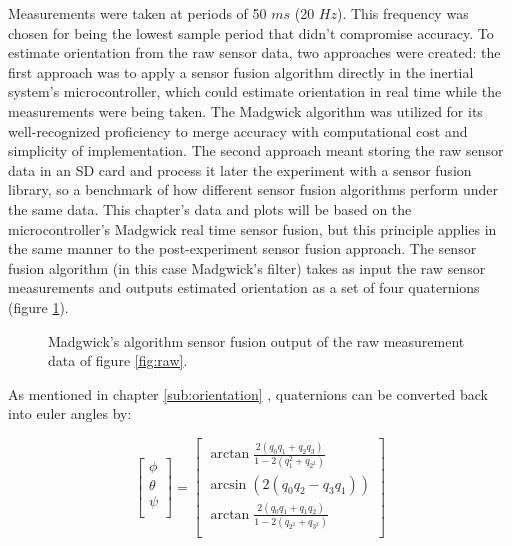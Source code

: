 Measurements were taken at periods of 50 $ms$ (20 $Hz$). This frequency was chosen for being the lowest sample period that didn't compromise accuracy. To estimate orientation from the raw sensor data, two approaches were created: the first approach was to apply a sensor fusion algorithm directly in the inertial system's microcontroller, which could estimate orientation in real time while the measurements were being taken. The Madgwick algorithm was utilized for its well-recognized proficiency to merge accuracy with computational cost and simplicity of implementation. The second approach meant storing the raw sensor data in an SD card and process it later the experiment with a sensor fusion library, so a benchmark of how different sensor fusion algorithms perform under the same data. This chapter's data and plots will be based on the microcontroller's Madgwick real time sensor fusion, but this principle applies in the same manner to the post-experiment sensor fusion approach. The sensor fusion algorithm (in this case Madgwick's filter) takes as input the raw sensor measurements and outputs estimated orientation as a set of four quaternions (figure \ref{fig:fusion_output}).


\begin{figure}[!h]
    \centering
    \resizebox{0.8\linewidth}{!}{}
    \caption{Madgwick's algorithm sensor fusion output of the raw measurement data of figure \ref{fig:raw}.}
    \label{fig:fusion_output}
\end{figure}


As mentioned in chapter \ref{sub:orientation} , quaternions can be converted back into euler angles by:

\begin{equation}
    \begin{bmatrix}
        \phi   \\
        \theta \\
        \psi   \\
    \end{bmatrix}
    =
    \begin{bmatrix}
        \arctan \frac{2(q_0q_1+q_2q_3)}{1-2(q{_1^2}+q_{2^2})} \\
        \arcsin (2(q_0q_2-q_3q_1))                            \\
        \arctan \frac{2(q_0q_1+q_1q_2)}{1-2(q_{2^2}+q_{3^2})} \\
    \end{bmatrix}
\end{equation}

